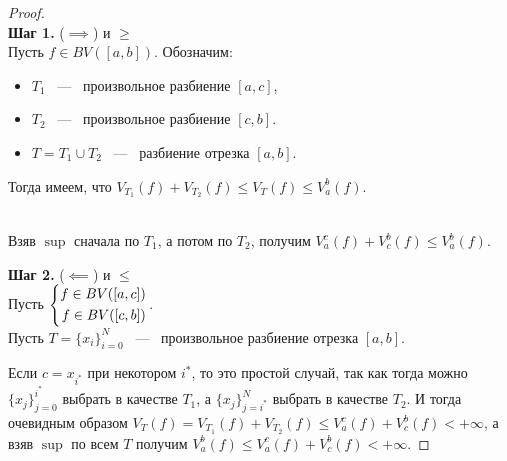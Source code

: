 \begin{proof} \ \\
	\textbf{Шаг 1. } ($\implies$) и $\geq$\\

    Пусть $f \in BV([a, b])$. Обозначим:
    \begin{itemize}
        \item $T_1$ ~---~ произвольное разбиение $[a, c]$,
        \item  $T_2$ ~---~ произвольное разбиение $[c, b]$.
        \item $T = T_1 \cup T_2$ ~---~ разбиение отрезка $[a, b]$.
    \end{itemize}
    Тогда имеем, что  $V_{T_1}(f) + V_{T_2}(f) \leq V_T(f) \leq V_a^b (f)$.

     \\
    Взяв $\sup$ сначала по $T_1$, а потом по $T_2$, получим $V_a^c (f) + V_c^b (f) \leq V_a^b (f)$.

    \textbf{Шаг 2.} ($\impliedby$) и $\leq$ \\
    Пусть $\left\{\begin{aligned}f \in BV([a, c]) \\ f \in BV([c, b])\end{aligned}\right.$.\\
    Пусть $T = \{x_i\}_{i=0}^N$ ~---~ произвольное разбиение отрезка $[a, b]$.

    Если $c = x_{i^{*}}$ при некотором $i^{*}$, то это простой случай, так как тогда можно $\{x_j\}_{j=0}^{i^{*}}$ выбрать в качестве $T_1$, а $\{x_j\}_{j=i^{*}}^N$ выбрать в качестве $T_2$. И тогда очевидным образом $V_T(f) = V_{T_1}(f) + V_{T_2} (f) \leq V_a^c(f) + V_c^b (f) < +\infty$, а взяв $\sup$ по всем $T$ получим $V_a^b(f) \leq V_a^c(f) + V_c^b (f) < +\infty$.


\end{proof}
